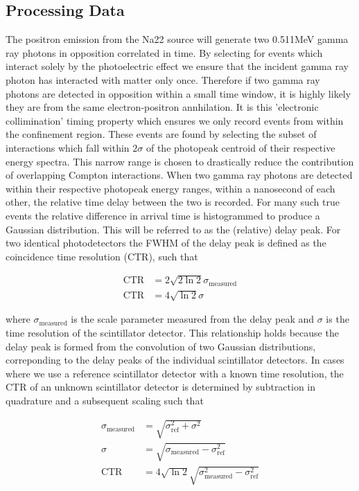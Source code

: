 \subsection{Processing Data}
The positron emission from the Na22 source will generate two 0.511MeV gamma ray photons in opposition correlated in time. By selecting for events which interact solely by the photoelectric effect we ensure that the incident gamma ray photon has interacted with matter only once. Therefore if two gamma ray photons are detected in opposition within a small time window, it is highly likely they are from the same electron-positron annhilation. It is this 'electronic collimination' timing property which ensures we only record events from within the confinement region. These events are found by selecting the subset of interactions which fall within $2\sigma$ of the photopeak centroid of their respective energy spectra. This narrow range is chosen to drastically reduce the contribution of overlapping Compton interactions. When two gamma ray photons are detected within their respective photopeak energy ranges, within a nanosecond of each other, the relative time delay between the two is recorded. For many such true events the relative difference in  arrival time is histogrammed to produce a Gaussian distribution. This will be referred to as the (relative) delay peak. For two identical photodetectors the FWHM of the delay peak is defined as the coincidence time resolution (CTR), such that

\begin{align}
\text{CTR} &= 2\sqrt{2\ln{2}}\sigma_\textrm{measured}\\
\text{CTR} &= 4\sqrt{\ln{2}}\sigma
\label{eqn:ctrtoscale}
\end{align}

where $\sigma_\textrm{measured}$ is the scale parameter measured from the delay peak and $\sigma$ is the time resolution of the scintillator detector. This relationship holds because the delay peak is formed from the convolution of two Gaussian distributions, correponding to the delay peaks of the individual scintillator detectors. In cases where we use a reference scintillator detector with a known time resolution, the CTR of an unknown scintillator detector is determined by subtraction in quadrature and a subsequent scaling such that

\begin{align}
\sigma_\textrm{measured} &= \sqrt{\sigma_\textrm{ref}^2+\sigma^2}\\
\sigma &= \sqrt{\sigma_\textrm{measured} - \sigma_\textrm{ref}^2}\\
\text{CTR} &= 4\sqrt{\ln{2}}\sqrt{\sigma_\textrm{measured}^2-\sigma_\textrm{ref}^2}
\end{align}

